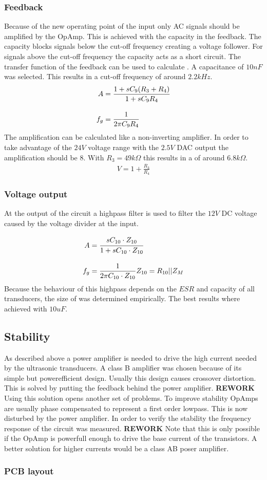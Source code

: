 \subsubsection*{Feedback}
%
Because of the new operating point of the input only AC signals should be amplified by the OpAmp. This is achieved with the capacity  in the feedback. The capacity blocks signals below the cut-off frequency creating a voltage follower. For signals above the cut-off frequency the capacity acts as a short circuit. The transfer function of the feedback can be used to calculate . A capacitance of $10nF$ was selected. This results in a cut-off frequency of around $2.2kHz$.
%
\begin{align}
  A &= \frac{1 + s C_9 (R_3 + R_4)}{1 + s C_9 R_4}\pmath
  f_g &= \frac{1}{2 \pi C_9 R_4}
\end{align}
%
The amplification can be calculated like a non-inverting amplifier. In order to take advantage of the $24V$ voltage range with the $2.5V$ DAC output the amplification should be $8$. With $R_3 = 49k\Omega$ this results in a  of around $6.8k\Omega$.
%
\begin{align}
  V = 1 + \frac{R_3}{R_4}
\end{align}
%
\subsubsection*{Voltage output}
At the output of the circuit a highpass filter is used to filter the $12V$ DC voltage caused by the voltage divider at the input.

\begin{align}
  A &= \cfrac{sC_{10} \cdot Z_{10}}{1 + sC_{10} \cdot Z_{10}} \pmath
  f_g &= \frac{1}{2 \pi C_{10} \cdot Z_{10}}
  Z_{10} = R_{10} || Z_M
\end{align}
%
Because the behaviour of this highpass depends on the $ESR$ and capacity of all transducers, the size of  was determined empirically. The best results where achieved with $10uF$.

\subsection{Stability}

As described above a power amplifier is needed to drive the high current needed by the ultrasonic transducers. A class B amplifier was chosen because of its simple but powerefficient design. Usually this design causes crossover distortion. This is solved by putting the feedback behind the power amplifier.\p
%
\textbf{REWORK}\p
Using this solution opens another set of problems. To improve stability OpAmps are usually phase compensated to represent a first order lowpass. This is now disturbed by the power amplifier.\p
%
In order to verify the stability the frequency response of the circuit was measured.\p
\textbf{REWORK}\p
%
Note that this is only possible if the OpAmp is powerfull enough to drive the base current of the transistors. A better solution for higher currents would be a class AB poser amplifier.\p

\subsubsection{PCB layout}